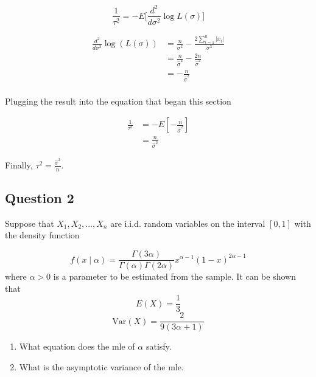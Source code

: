\documentclass{tufte-book}
\newcommand{\Var}{\mathrm{Var}}
\theoremstyle{mytheoremstyle}
\theoremstyle{mylemstyle}
\theoremstyle{mydefstyle}
\begin{document}
\begin{enumerate}
\[
\frac{1}{\tau^2} = -E\Big[\frac{d^2}{d\sigma^2}\log L(\sigma)\Big]
\]

\begin{align*}
\frac{d^2}{d\sigma^2}\log(L(\sigma)) &= \frac{n}{\sigma^2} - \frac{2\sum_{i=1}^n |x_i|}{\sigma^3}\\
&= \frac{n}{\hat{\sigma}^2} - \frac{2n}{\hat{\sigma}^2}\\
&= -\frac{n}{\hat{\sigma}^2}\\
\end{align*}

Plugging the result into the equation that began this section

\begin{align*}
\frac{1}{\tau^2} &= -E[-\frac{n}{\hat{\sigma}^2}]\\
&= \frac{n}{\hat{\sigma}^2}
\end{align*}

Finally, $\tau^2 = \frac{\hat{\sigma}^2}{n}$.

\end{enumerate}


\subsection{Question 2}
Suppose that $X_1, X_2, ..., X_n$ are i.i.d. random variables on the interval $[0,1]$ with the density function

\[f(x\mid \alpha) = \frac{\Gamma(3\alpha)}{\Gamma(\alpha)\Gamma(2\alpha)}x^{\alpha-1}(1-x)^{2\alpha -1} \]
where $\alpha > 0$ is a parameter to be estimated from the sample.  It can be shown that
\[ E(X) = \frac{1}{3} \]
\[ \Var(X) = \frac{2}{9(3\alpha+1)}\]

\begin{enumerate}
\item What equation does the mle of $\alpha$ satisfy.

\item What is the asymptotic variance of the mle.

\end{enumerate}
\end{document}
